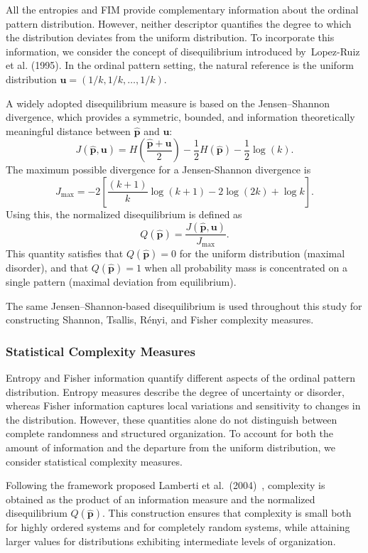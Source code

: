 \documentclass[12pt,a4paper]{article}
\begin{document}
All the entropies and FIM provide complementary information about the ordinal pattern distribution. However, neither descriptor quantifies the  degree to which the distribution deviates from the uniform distribution.
To incorporate this information, we consider the concept of disequilibrium introduced by~Lopez-Ruiz et al. (1995). In the ordinal pattern setting, the natural reference is the uniform distribution \(\mathbf{u}=(1/k,1/k,\ldots,1/k)\).

A widely adopted disequilibrium measure is based on the Jensen--Shannon divergence, which provides a symmetric, bounded, and information theoretically meaningful distance between \(\widehat{\mathbf{p}}\) and \(\mathbf{u}\): 
\[
J(\widehat{\mathbf{p}},\mathbf{u})
= H\!\left(\frac{\widehat{\mathbf{p}}+\mathbf{u}}{2}\right)
- \frac{1}{2}H(\widehat{\mathbf{p}})
- \frac{1}{2}\log(k).
\] 
The maximum possible divergence for a Jensen-Shannon divergence is 
\[
J_{\max}
= -2\left[\frac{(k+1)}{k}\log(k+1) - 2\log(2k) + \log k\right].
\] 
Using this, the normalized disequilibrium is defined as 
\[
Q(\widehat{\mathbf{p}}) = \frac{J(\widehat{\mathbf{p}},\mathbf{u})}{J_{\max}}.
\] 
This quantity satisfies that \(Q(\widehat{\mathbf{p}}) = 0\) for the uniform distribution (maximal disorder), and that \(Q(\widehat{\mathbf{p}}) = 1\) when all probability mass is concentrated on a single pattern (maximal deviation from equilibrium).

The same Jensen--Shannon-based disequilibrium is used throughout this study for constructing Shannon, Tsallis, Rényi, and Fisher complexity measures.

\subsubsection{Statistical Complexity Measures}
\label{complexity-measures}

Entropy and Fisher information quantify different aspects of the ordinal pattern distribution. Entropy measures describe the degree of uncertainty or disorder, whereas Fisher information captures local variations and sensitivity to changes in the distribution. However, these quantities
alone do not distinguish between complete randomness and structured organization. To account for both the amount of information and the departure from the uniform distribution, we consider statistical complexity measures.

Following the framework proposed Lamberti et al.~(2004)~\cite{lamberti2004intensive}, complexity is obtained as the product of an information measure and the normalized disequilibrium \(Q(\widehat{\mathbf p})\). This construction ensures that complexity is small both for highly ordered systems and for completely random systems, while attaining larger values for distributions exhibiting intermediate levels of organization.
\end{document}
